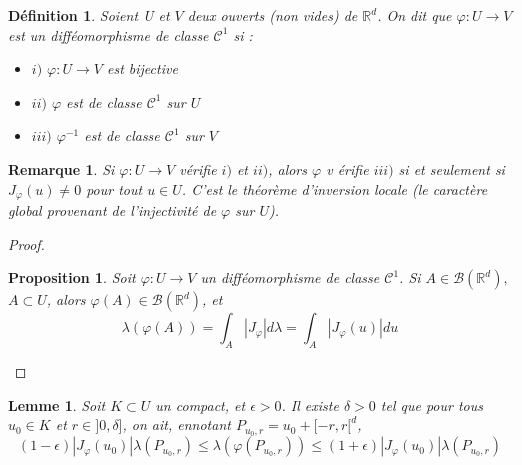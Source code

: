 \documentclass[3pt]{article}
\newtheorem{definition}[theorem]{D\'{e}finition}
\newtheorem{lemma}[theorem]{Lemme}
\newtheorem{proposition}[theorem]{Proposition}
\newtheorem{remark}[theorem]{Remarque}
\begin{document}
\bigskip 

\begin{definition}
Soient U et $V$ deux ouverts (non vides) de $\mathbb{R}^{d}$. On dit que $%
\varphi :U\rightarrow V$ est un diff\'{e}omorphisme de classe $\mathcal{C}%
^{1}$ si :

\begin{itemize}
\item $i)$ $\varphi :U\rightarrow V$ est bijective

\item $ii)$ $\varphi $ est de classe $\mathcal{C}^{1}$ sur $U$

\item $iii)$ $\varphi ^{-1}$ est de classe $\mathcal{C}^{1}$ sur $V$
\end{itemize}
\end{definition}

\bigskip 

\begin{remark}
Si $\varphi :U\rightarrow V$ v\'{e}rifie $i)$ et $ii)$, alors $\varphi $ v%
\'{e}rifie $iii)$ si et seulement si $J_{\varphi }(u)\neq 0$ pour tout $u\in
U$. C'est le th\'{e}or\`{e}me d'inversion locale (le caract\`{e}re global
provenant de l'injectivit\'{e} de $\varphi $ sur $U$).
\end{remark}

\bigskip 

\begin{proof}
\begin{proposition}
Soit $\varphi :U\rightarrow V$ un diff\'{e}omorphisme de classe $\mathcal{C}%
^{1}$. Si $A\in \mathcal{B}(\mathbb{R}^{d}),$ $A\subset U$, alors $\varphi
(A)\in \mathcal{B}(\mathbb{R}^{d})$, et%
\begin{equation*}
\lambda (\varphi (A))=\int_{A}\left\vert J_{\varphi }\right\vert d\lambda
=\int_{A}\left\vert J_{\varphi }(u)\right\vert du
\end{equation*}
\end{proposition}
\end{proof}

\bigskip 

\begin{lemma}
Soit $K\subset U$ un compact, et $\epsilon >0$. Il existe $\delta >0$ tel
que pour tous $u_{0}\in K$ et $r\in ]0,\delta ]$, on ait, ennotant $%
P_{u_{0},r}=u_{0}+[-r,r[^{d}$,%
\begin{equation*}
(1-\epsilon )\left\vert J_{\varphi }(u_{0})\right\vert \lambda
(P_{u_{0},r})\leq \lambda (\varphi (P_{u_{0},r}))\leq (1+\epsilon
)\left\vert J_{\varphi }(u_{0})\right\vert \lambda (P_{u_{0},r})
\end{equation*}
\end{lemma}
\end{document}
